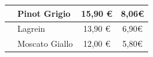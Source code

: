 \documentclass[12pt, a4paper]{article}
\begin{document}
\begin{longtable}{@{}|l|l|c|c|}
                         & Pinot Grigio                                                              & 15,90 €                                                         & 8,06€                                                                                                         \\ \hline
                         & Lagrein                                                                   & 13,90 €                                                         & 6,90€                                                                                                         \\ \hline
                         & Moscato Giallo                                                            & 12,00 €                                                         & 5,80€                                                                                                         \\ \hline
\end{longtable}
\end{document}
